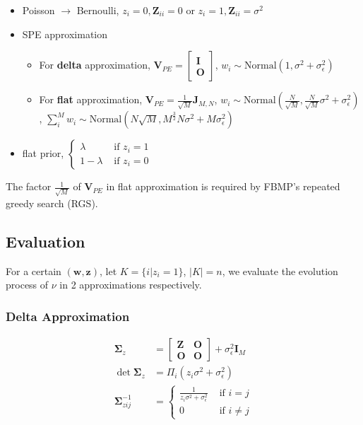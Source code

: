 \begin{itemize}
    \item Poisson $\rightarrow$ Bernoulli, $z_i=0,\bm{Z}_{ii}=0$ or $z_i=1,\bm{Z}_{ii}=\sigma^2$
    \item SPE approximation
    \begin{itemize}
    \item For \textbf{delta} approximation, $\bm{V}_{PE}=\begin{bmatrix}\bm{I} \\\bm{O}\end{bmatrix}$, $w_i\sim \mathrm{Normal}(1,\sigma^2+\sigma_\epsilon^2)$
    \item For \textbf{flat} approximation, $\bm{V}_{PE}=\frac{1}{\sqrt{M}}\bm{J}_{M,N}$, $w_i\sim \mathrm{Normal}(\frac{N}{\sqrt{M}},\frac{N}{\sqrt{M}}\sigma^2+\sigma_\epsilon^2)$, $\sum_i^M w_i\sim \mathrm{Normal}(N\sqrt{M},M^{\frac{3}{2}}N\sigma^2+M\sigma_\epsilon^2)$
    \end{itemize}
    \item flat prior, $\begin{cases}
        \lambda & \text{ if } z_i=1 \\ 
        1-\lambda & \text{ if } z_i=0 
    \end{cases}$
\end{itemize}

The factor $\frac{1}{\sqrt{M}}$ of $\bm{V}_{PE}$ in flat approximation is required by FBMP's repeated greedy search (RGS). 

\subsection{Evaluation}

For a certain $(\bm{w}, \bm{z})$, let $K=\{i|z_i=1\}$, $|K|=n$, we evaluate the evolution process of $\nu$ in 2 approximations respectively. 

\subsubsection{Delta Approximation}

\begin{equation}
\begin{aligned}
    \bm{\Sigma}_z &= \begin{bmatrix}
        \bm{Z} & \bm{O} \\
        \bm{O} & \bm{O}
    \end{bmatrix} + \sigma_\epsilon^2\bm{I}_M \\
    \det\bm{\Sigma}_z &= \Pi_i (z_i\sigma^2+\sigma_\epsilon^2) \\
    \bm{\Sigma}_{zij}^{-1} &= \begin{cases}
        \frac{1}{z_i\sigma^2+\sigma_\epsilon^2} & \text{ if }  i=j \\ 
        0 & \text{ if }  i\neq j 
    \end{cases}
\end{aligned}
\end{equation}

